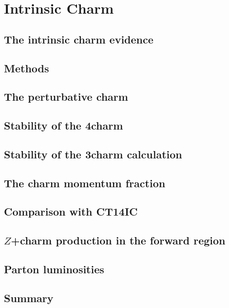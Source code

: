 
\chapter{Intrinsic Charm}
\label{ch:ic}
\minitoc
\adjustmtc



\section{The intrinsic charm evidence}
\label{sec:ic/intro}


\section{Methods}
\label{sec:ic/methods}


\section{The perturbative charm \pdf}
\label{sec:ic/consistency}


\section{Stability of the 4\fns charm \pdf}
\label{sec:ic/charm_stability_4fns}


\section{Stability of the 3\fns charm calculation}
\label{sec:ic/charm_stability_3fns}


\section{The charm momentum fraction}
\label{sec:ic/charm_mom_frac}


\section{Comparison with  CT14IC}
\label{sec:ic/ct}


\section{$Z$+charm production in the forward region}
\label{sec:ic/zcharm}


\section{Parton luminosities}
\label{sec:ic/lumis}


\section{Summary}
\label{sec:ic/summary}

